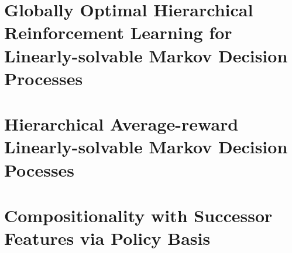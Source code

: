 \documentclass[12pt, a4paper,twoside]{tesi_upf}
\begin{document}
\chapter{Globally Optimal Hierarchical Reinforcement Learning for Linearly-solvable Markov Decision Processes}

\chapter{Hierarchical Average-reward Linearly-solvable Markov Decision Pocesses}

\chapter{Compositionality with Successor Features via Policy Basis}

% 




\appendix


\backmatter 
\printindex
\end{document}
